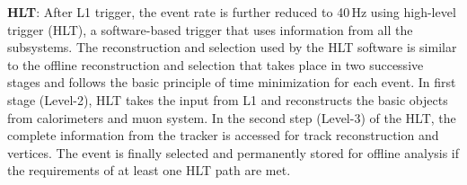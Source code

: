 \textbf{HLT}: After L1 trigger, the event rate is further reduced to 40\,Hz using high-level trigger (HLT), a software-based trigger that uses information from all the subsystems. The reconstruction and selection used by the HLT software is similar to the offline reconstruction and selection that takes place in two successive stages and follows the basic principle of time minimization for each event. In first stage (Level-2), HLT takes the input from L1 and reconstructs the basic objects from calorimeters and muon system. In the second step (Level-3) of the HLT, the complete information from the tracker is accessed for track reconstruction and vertices. The event is finally selected and permanently stored for offline analysis if the requirements of at least one HLT path are met.


\clearpage{\pagestyle{empty}\cleardoublepage}
